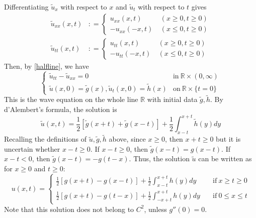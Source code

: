 \documentclass[10pt]{article}
\def\rr{{\mathbb R}}
\begin{document}
Differentiating $\widetilde{u}_x$ with respect to $x$ and $\widetilde{u}_t$ with respect to $t$ gives
\begin{align*}
    \widetilde{u}_{xx}(x,t)&: = \begin{cases}
        u_{xx}(x,t) & \ (x \geq 0, t\geq 0)\\
        -u_{xx}(-x,t) &  \ (x \leq 0, t\geq 0)
                            \end{cases}\\
    \widetilde{u}_{tt}(x,t)&: = \begin{cases}
        u_{tt}(x,t) & \ (x \geq 0, t\geq 0)\\
        -u_{tt}(-x,t) &  \ (x \leq 0, t\geq 0)
                            \end{cases}
\end{align*}
Then, by \ref{halfline}, we have
\begin{equation*}
    \begin{cases}
        \widetilde{u}_{tt} - \widetilde{u}_{xx} = 0 & \text{in} \ \rr \times (0,\infty)\\
        \widetilde{u}(x,0) = \widetilde{g}(x), \widetilde{u}_t(x,0) = \widetilde{h}(x) & \text{on} \ \rr \times \{t=0\}
    \end{cases}
\end{equation*}
This is the wave equation on the whole line $\rr$ with initial data $\widetilde{g}, \widetilde{h}$. By d'Alembert's formula, the solution is
\begin{equation*}
    \widetilde{u}(x,t) = \frac{1}{2}[\widetilde{g}(x+t) + \widetilde{g}(x-t)] + \frac{1}{2}\int_{x-t}^{x+t} \widetilde{h}(y) dy
\end{equation*}
Recalling the definitions of $\widetilde{u}, \widetilde{g}, \widetilde{h}$ above, since $x \geq 0$, then $x+t \geq 0$ but it is uncertain whether $x-t \geq 0$. If $x-t \geq 0$, then $\widetilde{g}(x-t) = g(x-t)$. If $x-t < 0$, then $\widetilde{g}(x-t) = -g(t-x)$. Thus, the solution $\widetilde{u}$ can be written as for $x \geq 0$ and $t \geq 0$:
\begin{equation}
    \label{halfline_sol}
    u(x,t) = \begin{cases}
        \frac{1}{2}[g(x+t) - g(x-t)] + \frac{1}{2}\int_{x-t}^{x+t} h(y) dy & \quad \text{if} \ x \geq t \geq 0\\
        \frac{1}{2}[g(x+t) - g(t-x)] + \frac{1}{2}\int_{-x+t}^{x+t} h(y) dy &  \quad \text{if} \ 0 \leq x \leq t 
            \end{cases}
\end{equation}
Note that this solution does not belong to $C^2$, unless $g''(0)  = 0$.
\end{document}
